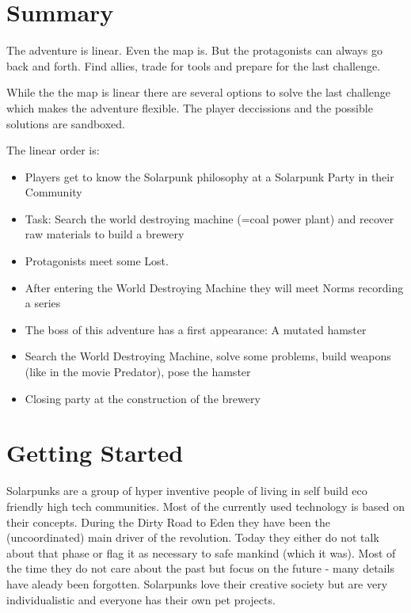 \section{Summary}

The adventure is linear. Even the map is. But the protagonists can always go back and forth. Find allies, trade for tools and prepare for the last challenge.

While the the map is linear there are several options to solve the last challenge which makes the adventure flexible. The player deccissions and the possible solutions are sandboxed.

The linear order is:

\begin{itemize}
\item Players get to know the Solarpunk philosophy at a Solarpunk Party in their Community
\item Task: Search the world destroying machine (=coal power plant) and recover raw materials to build a brewery
\item Protagonists meet some Lost.
\item After entering the World Destroying Machine they will meet Norms recording a series
\item The boss of this adventure has a first appearance: A mutated hamster
\item Search the World Destroying Machine, solve some problems, build weapons (like in the movie Predator), pose
the hamster
\item Closing party at the construction of the brewery
\end{itemize}

\section{Getting Started}

\begin{sidebarBox}[title=Solarpunks]
Solarpunks are a group of hyper inventive people of living in self build eco friendly high tech communities. Most of the currently used technology is based on their concepts. During the Dirty Road to Eden they have been the (uncoordinated) main driver of the revolution. Today they either do not talk about that phase or flag it as necessary to safe mankind (which it was). Most of the time they do not care about the past but focus on the future - many details have aleady been forgotten. Solarpunks love their creative society but are very individualistic and everyone has their own pet projects.
\end{sidebarBox}

